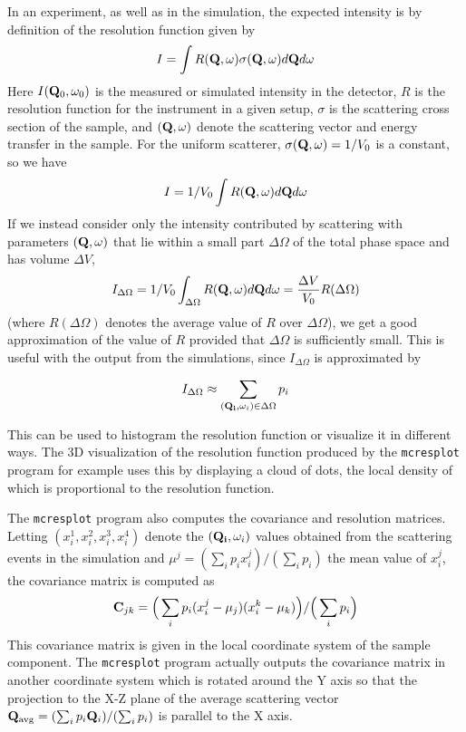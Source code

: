 In an experiment, as well as in the simulation, the expected intensity
is by definition of the resolution function given by
%
$$
  I = \int R({\bf Q}, \omega) \sigma({\bf Q}, \omega) d{\bf Q}d\omega
$$
%
Here $I({\bf Q}_0, \omega_0)$ is the measured or simulated intensity in
the detector, $R$ is the resolution function for the instrument in a
given setup, $\sigma$ is the scattering cross section of the sample, and
$({\bf Q}, \omega)$ denote the scattering vector and energy transfer in
the sample. For the uniform scatterer, $\sigma({\bf Q}, \omega) = 1/V_0$
is a constant, so we have
%
$$
  I = 1/V_0 \int R({\bf Q}, \omega) d{\bf Q}d\omega
$$
%
If we instead consider only the intensity contributed by scattering with
parameters $({\bf Q}, \omega)$ that lie within a small part $\Delta\Omega$ of
the total phase space and has volume $\Delta V$,
%
$$
  I_{\Delta\Omega} = 1/V_0 \int_{\Delta\Omega} R({\bf Q}, \omega) d{\bf Q}d\omega
  = \frac{\Delta V}{V_0} R(\Delta\Omega)
$$
%
(where $R(\Delta\Omega)$ denotes the average value of $R$ over
$\Delta\Omega$), we get a good approximation of the value of $R$
provided that $\Delta\Omega$ is sufficiently small. This is useful with
the output from the simulations, since $I_{\Delta\Omega}$ is
approximated by

$$ I_{\Delta\Omega} \approx \sum_{({\bf Q_i},\omega_i) \in \Delta\Omega} p_i $$


This can be used to
histogram the resolution function or visualize it in different ways. The
3D visualization of the resolution function produced by the
\verb+mcresplot+ program for example uses this by displaying a cloud of
dots, the local density of which is proportional to the resolution
function.

The \verb+mcresplot+ program also computes the covariance and resolution
matrices. Letting $(x^1_i,x^2_i,x^3_i,x^4_i)$ denote the $({\bf
  Q_i},\omega_i)$ values obtained from the scattering events in the
simulation and $\mu^j = (\sum_i p_i x^j_i) / (\sum_i p_i)$ the mean
value of $x^j_i$, the covariance matrix is computed as
$$ {\bf C}_{jk} = \Big(\sum_i p_i (x^j_i - \mu_j) (x^k_i - \mu_k)\Big) /
   \Big(\sum_i p_i\Big) $$
This covariance matrix is given in the local coordinate system of the
sample component. The \verb+mcresplot+ program actually outputs the
covariance matrix in another coordinate system which is rotated around
the Y axis so that the projection to the X-Z plane of the average
scattering vector ${\bf Q}_{\rm avg} = (\sum_i p_i {\bf Q}_i) / (\sum_i
p_i)$ is parallel to the X axis.

